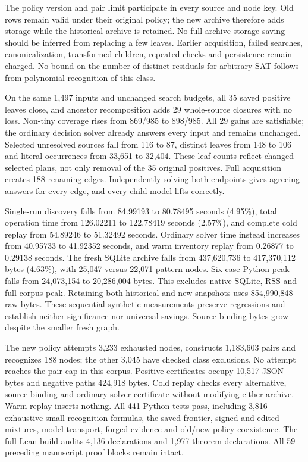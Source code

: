 \documentclass[11pt,a4paper]{article}
\numberwithin{equation}{section}
\theoremstyle{plain}
\theoremstyle{definition}
\theoremstyle{remark}
\begin{document}
The policy version and pair limit participate in every source and node key. Old rows remain valid under their original policy; the new archive therefore adds storage while the historical archive is retained. No full-archive storage saving should be inferred from replacing a few leaves. Earlier acquisition, failed searches, canonicalization, transformed children, repeated checks and persistence remain charged. No bound on the number of distinct residuals for arbitrary SAT follows from polynomial recognition of this class.

On the same 1,497 inputs and unchanged search budgets, all 35 saved positive leaves close, and ancestor recomposition adds 29 whole-source closures with no loss. Non-tiny coverage rises from 869/985 to 898/985. All 29 gains are satisfiable; the ordinary decision solver already answers every input and remains unchanged. Selected unresolved sources fall from 116 to 87, distinct leaves from 148 to 106 and literal occurrences from 33,651 to 32,404. These leaf counts reflect changed selected plans, not only removal of the 35 original positives. Full acquisition creates 188 renaming edges. Independently solving both endpoints gives agreeing answers for every edge, and every child model lifts correctly.

Single-run discovery falls from 84.99193 to 80.78495 seconds (4.95\%), total operation time from 126.02211 to 122.78419 seconds (2.57\%), and complete cold replay from 54.89246 to 51.32492 seconds. Ordinary solver time instead increases from 40.95733 to 41.92352 seconds, and warm inventory replay from 0.26877 to 0.29138 seconds. The fresh SQLite archive falls from 437,620,736 to 417,370,112 bytes (4.63\%), with 25,047 versus 22,071 pattern nodes. Six-case Python peak falls from 24,073,154 to 20,286,004 bytes. This excludes native SQLite, RSS and full-corpus peak. Retaining both historical and new snapshots uses 854,990,848 raw bytes. These sequential synthetic measurements preserve regressions and establish neither significance nor universal savings. Source binding bytes grow despite the smaller fresh graph.

The new policy attempts 3,233 exhausted nodes, constructs 1,183,603 pairs and recognizes 188 nodes; the other 3,045 have checked class exclusions. No attempt reaches the pair cap in this corpus. Positive certificates occupy 10,517 JSON bytes and negative paths 424,918 bytes. Cold replay checks every alternative, source binding and ordinary solver certificate without modifying either archive. Warm replay inserts nothing. All 441 Python tests pass, including 3,816 exhaustive small recognition formulas, the saved frontier, signed and edited mixtures, model transport, forged evidence and old/new policy coexistence. The full Lean build audits 4,136 declarations and 1,977 theorem declarations. All 59 preceding manuscript proof blocks remain intact.
\end{document}

